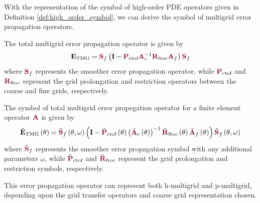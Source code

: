 With the representation of the symbol of high-order PDE operators given in Definition \ref{def:high_order_symbol}, we can derive the symbol of multigrid error propagation operators.

The total multigrid error propagation operator is given by
\begin{equation}
\mathbf{E}_{\text{TMG}} = {\color{burgundy}\mathbf{S}}_f \left( \mathbf{I} - {\color{burgundy}\mathbf{P}}_{\text{ctof}} {\color{burgundy}\mathbf{A}}_c^{-1} {\color{burgundy}\mathbf{R}}_{\text{ftoc}} {\color{burgundy}\mathbf{A}}_f \right) {\color{burgundy}\mathbf{S}}_f
\end{equation}
where ${\color{burgundy}\mathbf{S}}_f$ represents the smoother error propagation operator, while ${\color{burgundy}\mathbf{P}}_{\text{ctof}}$ and ${\color{burgundy}\mathbf{R}}_{\text{ftoc}}$ represent the grid prolongation and restriction operators between the coarse and fine grids, respectively.

\begin{definition}
The symbol of total multigrid error propegation operator for a finite element operator ${\color{burgundy}\mathbf{A}}$ is given by
\begin{equation}
\tilde{\mathbf{E}}_{\text{TMG}} \left( \mathbf{\theta} \right) = \tilde{{\color{burgundy}\mathbf{S}}}_f \left( \mathbf{\theta}, \omega \right) \left( \mathbf{I} - \tilde{{\color{burgundy}\mathbf{P}}}_{\text{ctof}} \left( \mathbf{\theta} \right) \left(\tilde{{\color{burgundy}\mathbf{A}}}_c \left( \mathbf{\theta} \right) \right)^{-1} \tilde{{\color{burgundy}\mathbf{R}}}_{\text{ftoc}} \left( \mathbf{\theta} \right) \tilde{{\color{burgundy}\mathbf{A}}}_f \left( \mathbf{\theta} \right) \right) \tilde{{\color{burgundy}\mathbf{S}}}_f \left( \mathbf{\theta}, \omega \right)
\end{equation}
where $\tilde{{\color{burgundy}\mathbf{S}}}_f$ represents the smoother error propagation symbol with any additional parameters $\omega$, while $\tilde{{\color{burgundy}\mathbf{P}}}_{\text{ctof}}$ and $\tilde{{\color{burgundy}\mathbf{R}}}_{\text{ftoc}}$ represent the grid prolongation and restriction symbols, respectively.
\label{def:multigrid_symbol}
\end{definition}

This error propagation operator can represent both h-multigrid and p-multigrid, depending upon the grid transfer operators and coarse grid representation chosen.

